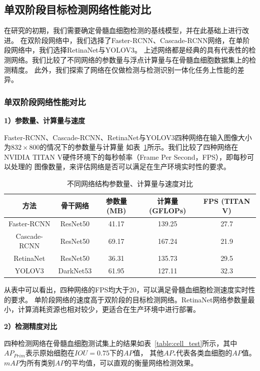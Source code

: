 \subsection{单双阶段目标检测网络性能对比}

在研究的初期，我们需要确定骨髓血细胞检测的基线模型，并在此基础上进行改进。
在双阶段网络中，我们选择了Faster-RCNN、Cascade-RCNN网络，在单阶段网络中，我们选择RetinaNet与YOLOV3。
上述网络都是经典的具有代表性的检测网络。我们比较了不同网络的参数量与浮点计算量与在骨髓血细胞数据集上的检测精度。
此外，我们探索了网络在仅做检测与检测识别一体化任务上性能的差异。

\subsubsection{单双阶段网络性能对比}

\textbf{1）参数量、计算量与速度}

Faster-RCNN、Cascade-RCNN、RetinaNet与YOLOV3四种网络在输入图像大小为$832 \times 800$的情况下的参数量与计算量
如表~\ref{table:cell_Network}所示。我们比较了四种网络在NVIDIA TITAN V硬件环境下的每秒帧率（Frame Per Second，FPS），即每秒可以处理的
图像数量，来评估网络是否可以满足在生产环境实时性的要求。

\begin{table}
  \caption{不同网络结构参数量、计算量与速度对比}   
  \centering 
  \label{table:cell_Network}
  \begin{tabular}{ccccc}
    \toprule[2pt]
    方法 & 骨干网络  & 参数量(MB) & 计算量(GFLOPs) & FPS (TITAN V) \\
    \midrule[1.5pt] 
    Faster-RCNN & ResNet50 &  41.17 & 139.25 & 27.7 \\ 
    Cascade-RCNN & ResNet50 & 69.17 & 167.24 & 21.9   \\ 
    RetinaNet & ResNet50 & 36.31 & 135.73 & 29.5   \\ 
    YOLOV3 & DarkNet53 & 61.95 & 127.11 & 32.3  \\ 
    \bottomrule[2pt]      
  \end{tabular} 
\end{table}

从表中可以看出，四种网络的FPS均大于20，可以满足骨髓血细胞检测速度实时性的要求。
单阶段网络的速度高于双阶段的目标检测网络。RetinaNet网络参数量最小，计算消耗资源也相对较少，更适合在生产环境中进行部署。

\textbf{2）检测精度对比}

四种检测网络在骨髓血细胞测试集上的结果如表~\ref{table:cell_test}所示，其中$AP_{Prim}$表示原始细胞在$IOU=0.75$下的$AP$值，
其他$AP_{*}$代表各类血细胞的$AP$值。$mAP$为所有类别$AP$的平均值，可以直观的衡量网络检测效果。

